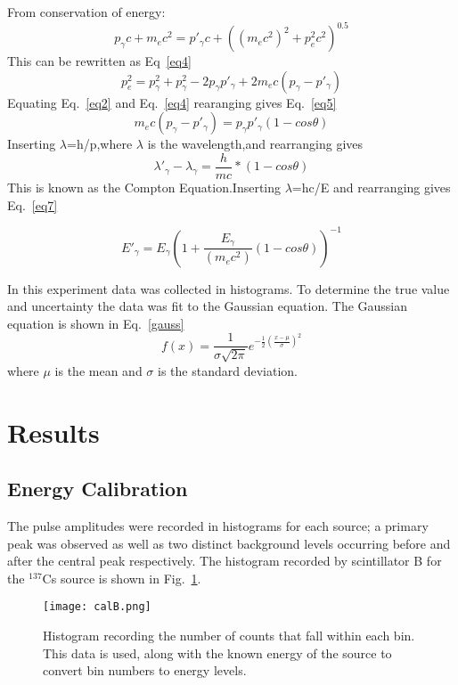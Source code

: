 \documentclass[prb,preprint,groupaddress,showpacs,superbib,floats]{revtex4-1}
\begin{document}
From conservation of energy:
\begin{equation}\label{eq3}
p_\gamma c+ m_e c^2= p'_\gamma c+((m_e c^2 )^2+p_e^2 c^2 )^0.5
\end{equation}
This can be rewritten as Eq~\ref{eq4} 
\begin{equation}\label{eq4}
p_e^2= p_\gamma^{2} + p_\gamma^{2} - 2p_\gamma p'_\gamma + 2m_e c (p_\gamma-p'_\gamma )
\end{equation}
Equating Eq.~\ref{eq2} and Eq.~\ref{eq4} rearanging gives Eq.~\ref{eq5}
\begin{equation}\label{eq5}
m_e c(p_\gamma-p'_\gamma )= p_\gamma p'_\gamma (1-cos\theta)
\end{equation}
Inserting $\lambda$=h/p,where $\lambda$ is the wavelength,and rearranging gives
\begin{equation}\label{eq6}
\lambda'_\gamma- \lambda_\gamma=\frac{h}{mc}*(1-cos\theta)
\end{equation}
This is known as the Compton Equation.Inserting $\lambda$=hc/E and rearranging gives Eq.~\ref{eq7}

\[E'_\gamma= E_\gamma(1+\frac{E_\gamma}{(m_e c^2 )} (1-cos \theta))^{-1}\]

In this experiment data was collected in histograms. To determine the true value and uncertainty the data was fit to the Gaussian equation. The Gaussian equation is shown in Eq.~\ref{gauss}
\begin{equation}\label{gauss}
f(x) = \frac{1}{\sigma \sqrt{2\pi}}e^{-\frac{1}{2} (\frac{x-\mu}\sigma{})^2}
\end{equation}
where $\mu$ is the mean and $\sigma$ is the standard deviation.

\section{Results}\label{results}

\subsection{Energy Calibration}

The pulse amplitudes were recorded in histograms for each source; a primary peak was observed as well as two distinct background levels occurring before and after the central peak respectively. The histogram recorded by scintillator B for the $^{137}$Cs source is shown in Fig.~\ref{histB}. 
%
\begin{figure}[h]
	\centering
	\texttt{[image: calB.png]}
	\caption{Histogram recording the number of counts that fall within each bin. This data is used, along with the known energy of the source to convert bin numbers to energy levels.}
	\label{histB}
\end{figure}
\end{document}
